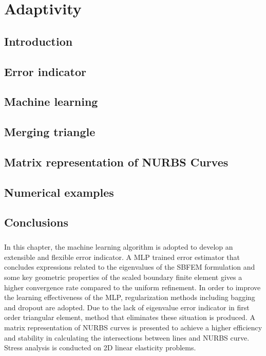 
\chapter{Adaptivity}
\label{adp_sec:main}
\section{Introduction}


\section{Error indicator}
\label{adap_sec:error_indicator}


\section{Machine learning}



\section{Merging triangle}
\label{adap_merge_triangle}




\section{Matrix representation of NURBS Curves}
\label{adap_sec_mrep2d}



\section{Numerical examples}




\section{Conclusions}
\paragraph{}
In this chapter, the machine learning algorithm is adopted to develop an extensible and flexible error indicator.
A MLP trained error estimator that concludes expressions related to the eigenvalues of the SBFEM formulation and some key geometric properties of the scaled boundary finite element gives a higher convergence rate compared to the uniform refinement.
In order to improve the learning effectiveness of the MLP, regularization methods including bagging and dropout are adopted.
Due to the lack of eigenvalue error indicator in first order triangular element, method that eliminates these situation is produced.
A matrix representation of NURBS curves is presented to achieve a higher efficiency and stability in calculating the intersections between lines and NURBS curve.
Stress analysis is conducted on 2D linear elasticity problems.